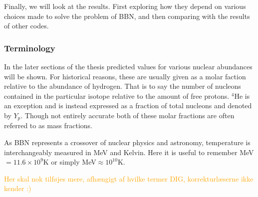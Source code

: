 \noindent Finally, we will look at the results. First exploring how they depend on various choices made to solve the problem of BBN, and then comparing with the results of other codes.



\subsubsection{Terminology}

In the later sections of the thesis predicted values for various nuclear abundances will be shown. For historical reasons, these are usually given as a molar faction relative to the abundance of hydrogen. That is to say the number of nucleons contained in the particular isotope relative to the amount of free protons. ${}^4$He is an exception and is instead expressed as a fraction of total nucleons and denoted by $Y_p$. Though not entirely accurate both of these molar fractions are often referred to as mass fractions. 

As BBN represents a crossover of nuclear physics and astronomy, temperature is interchangeably measured in MeV and Kelvin. Here it is useful to remember MeV$=11.6\times10^9 $K or simply MeV$\approx 10^{10}$K.


\textcolor{orange}{Her skal nok tilføjes mere, afhængigt af hvilke termer DIG, korrekturlæserne ikke kender :)}